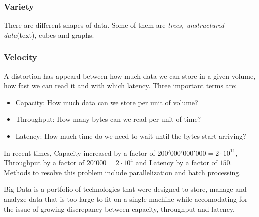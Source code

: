 \subsubsection{Variety}

There are different shapes of data. Some of them are \textit{trees, unstructured data}(text){, cubes and graphs}.


\subsubsection{Velocity}

A distortion has appeard between how much data we can store in a given volume, how fast we can read it and with which latency. Three important terms are:
\begin{itemize}
    \item Capacity: How much data can we store per unit of volume?
    \item Throughput: How many bytes can we read per unit of time?
    \item Latency: How much time do we need to wait until the bytes start arriving?
\end{itemize}
In recent times, Capacity increased by a factor of $200'000'000'000 = 2 \cdot 10^11$, Throughput by a factor of $20'000 = 2 \cdot 10^4$ and Latency by a factor of $150$.
Methods to resolve this problem include parallelization and batch processing.

\begin{definition}
    Big Data is a portfolio of technologies that were designed to store, manage and analyze data that is too large to fit on a single machine while accomodating for the issue of growing discrepancy between capacity, throughput and latency.
\end{definition}
